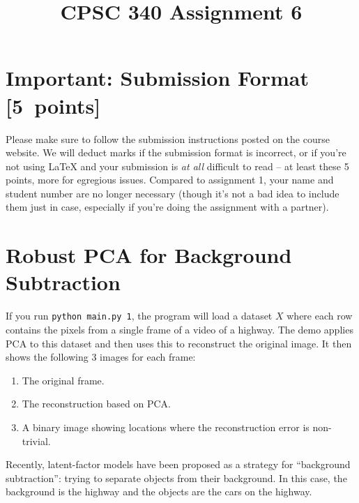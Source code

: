 \documentclass{article}
\newcommand{\blu}[1]{{\textcolor{blu}{#1}}}
\let\ask\blu
\newcommand\pts[1]{\textcolor{pointscolour}{[#1~points]}}
\begin{document}
\title{CPSC 340 Assignment 6}
\date{}
\maketitle
\vspace{-6em}


\section*{Important: Submission Format \pts{5}}

Please make sure to follow the submission instructions posted on the course website.
\ask{We will deduct marks if the submission format is incorrect, or if you're not using \LaTeX{} and your submission is \emph{at all} difficult to read} -- at least these 5 points, more for egregious issues.
Compared to assignment 1, your name and student number are no longer necessary (though it's not a bad idea to include them just in case, especially if you're doing the assignment with a partner).

\vspace{1em}

\section{Robust PCA for Background Subtraction}

If you run \verb|python main.py 1|, the program will load a dataset $X$ where each row contains the pixels from a single frame of a video of a highway. The demo applies PCA to this dataset and then uses this to reconstruct the original image.
It then shows the following 3 images for each frame:
\begin{enumerate}
	\item The original frame.
	\item The reconstruction based on PCA.
	\item A binary image showing locations where the reconstruction error is non-trivial.
\end{enumerate}
Recently, latent-factor models have been proposed as a strategy for ``background subtraction'': trying to separate objects from their background. In this case, the background is the highway and the objects are the cars on the highway.
\end{document}
